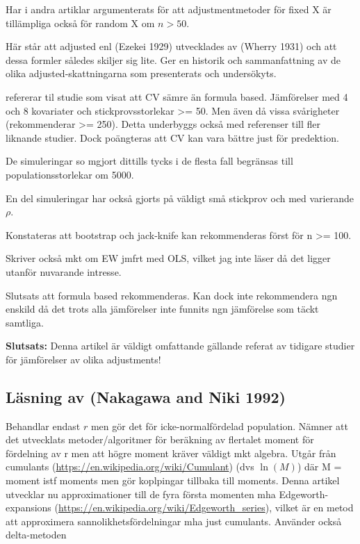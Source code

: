 \documentclass[]{article}
\begin{document}
Har i andra artiklar argumenterats för att adjustmentmetoder för fixed X
är tillämpliga också för random X om \(n > 50\).

Här står att adjusted enl (Ezekei 1929) utvecklades av (Wherry 1931) och
att dessa formler således skiljer sig lite. Ger en historik och
sammanfattning av de olika adjusted-skattningarna som presenterats och
undersökyts.

refererar til studie som visat att CV sämre än formula based.
Jämförelser med 4 och 8 kovariater och stickprovsstorlekar
\textgreater{}= 50. Men även då vissa svårigheter (rekommenderar
\textgreater{}= 250). Detta underbyggs också med referenser till fler
liknande studier. Dock poängteras att CV kan vara bättre just för
predektion.

De simuleringar so mgjort dittills tycks i de flesta fall begränsas till
populationsstorlekar om 5000.

En del simuleringar har också gjorts på väldigt små stickprov och med
varierande \(\rho\).

Konstateras att bootstrap och jack-knife kan rekommenderas först för n
\textgreater{}= 100.

Skriver också mkt om EW jmfrt med OLS, vilket jag inte läser då det
ligger utanför nuvarande intresse.

Slutsats att formula based rekommenderas. Kan dock inte rekommendera ngn
enskild då det trots alla jämförelser inte funnits ngn jämförelse som
täckt samtliga.

\textbf{Slutsats:} Denna artikel är väldigt omfattande gällande referat
av tidigare studier för jämförelser av olika adjustments!

\subsection{Läsning av (Nakagawa and Niki
1992)}\label{lasning-av-nakagawa1992}

Behandlar endast \(r\) men gör det för icke-normalfördelad population.
Nämner att det utvecklats metoder/algoritmer för beräkning av flertalet
moment för fördelning av r men att högre moment kräver väldigt mkt
algebra. Utgår från cumulants
(\url{https://en.wikipedia.org/wiki/Cumulant}) (dvs \(\ln(M)\)) där M =
moment istf moments men gör koplpingar tillbaka till moments. Denna
artikel utvecklar nu approximationer till de fyra första momenten mha
Edgeworth-expansions
(\url{https://en.wikipedia.org/wiki/Edgeworth_series}), vilket är en
metod att approximera sannolikhetsfördelningar mha just cumulants.
Använder också delta-metoden
\end{document}
